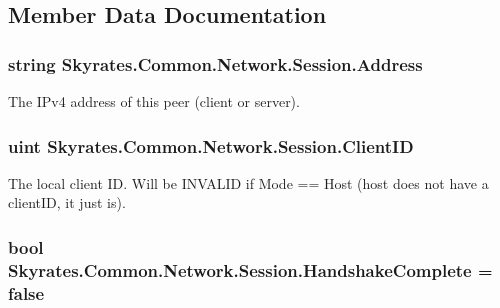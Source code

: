 \subsection{Member Data Documentation}
\hypertarget{class_skyrates_1_1_common_1_1_network_1_1_session_ac6ecaf40c7cae0c6c7d6e8de1b2a892c}{
\subsubsection[{Address}]{\setlength{\rightskip}{0pt plus 5cm}string Skyrates.\-Common.\-Network.\-Session.\-Address}}\label{class_skyrates_1_1_common_1_1_network_1_1_session_ac6ecaf40c7cae0c6c7d6e8de1b2a892c}


The I\-Pv4 address of this peer (client or server). 

\hypertarget{class_skyrates_1_1_common_1_1_network_1_1_session_aac06adc8a6108e66ce1c465f60d9f95e}{
\subsubsection[{Client\-I\-D}]{\setlength{\rightskip}{0pt plus 5cm}uint Skyrates.\-Common.\-Network.\-Session.\-Client\-I\-D}}\label{class_skyrates_1_1_common_1_1_network_1_1_session_aac06adc8a6108e66ce1c465f60d9f95e}


The local client I\-D. Will be I\-N\-V\-A\-L\-I\-D if Mode == Host (host does not have a client\-I\-D, it just is). 

\hypertarget{class_skyrates_1_1_common_1_1_network_1_1_session_aa819705fe7a825f718a25cf932471a47}{
\subsubsection[{Handshake\-Complete}]{\setlength{\rightskip}{0pt plus 5cm}bool Skyrates.\-Common.\-Network.\-Session.\-Handshake\-Complete = false}}\label{class_skyrates_1_1_common_1_1_network_1_1_session_aa819705fe7a825f718a25cf932471a47}


